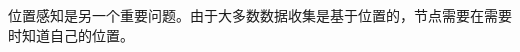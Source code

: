 \documentclass[journal]{IEEEtran}
\begin{document}
\begin{CJK}{UTF8}{gbsn}
位置感知是另一个重要问题。由于大多数数据收集是基于位置的，节点需要在需要时知道自己的位置。


%
%



%
%



\end{CJK}
\end{document}
